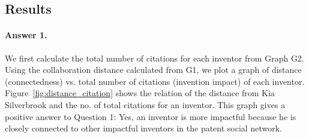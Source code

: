 \subsection{Results}

\paragraph{Answer 1.}
We first calculate the total number of citations for each inventor from Graph G2. Using the collaboration distance calculated from G1, we plot a graph of distance (connectedness) vs. total number of citations (invention impact) of each inventor. 
Figure~\ref{fig:distance_citation} shows the relation of the distance from
Kia Silverbrook and the no. of total citations for an inventor. This graph gives a positive answer to Question 1: 
Yes, an inventor is more impactful because he is closely
connected to other impactful inventors in the patent social network.

